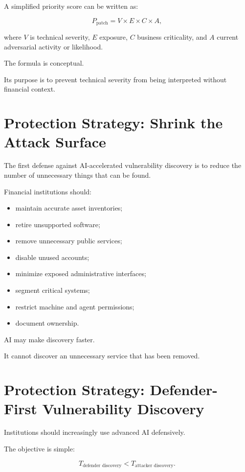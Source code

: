 A simplified priority score can be written as:

\begin{equation}
P_{\text{patch}}
=
V
\times
E
\times
C
\times
A,
\end{equation}

where \(V\) is technical severity, \(E\) exposure, \(C\) business criticality, and \(A\) current adversarial activity or likelihood.

The formula is conceptual.

Its purpose is to prevent technical severity from being interpreted without financial context.

\section{Protection Strategy: Shrink the Attack Surface}

The first defense against AI-accelerated vulnerability discovery is to reduce the number of unnecessary things that can be found.

Financial institutions should:

\begin{itemize}
    \item maintain accurate asset inventories;
    \item retire unsupported software;
    \item remove unnecessary public services;
    \item disable unused accounts;
    \item minimize exposed administrative interfaces;
    \item segment critical systems;
    \item restrict machine and agent permissions;
    \item document ownership.
\end{itemize}

AI may make discovery faster.

It cannot discover an unnecessary service that has been removed.

\section{Protection Strategy: Defender-First Vulnerability Discovery}

Institutions should increasingly use advanced AI defensively.

The objective is simple:

\begin{equation}
T_{\text{defender discovery}}
<
T_{\text{attacker discovery}}.
\end{equation}

